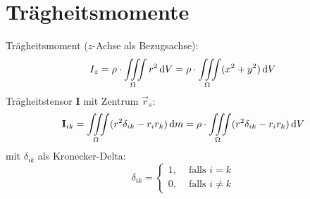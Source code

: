 \section{Trägheitsmomente}
Trägheitsmoment ($z$-Achse als Bezugsachse):
\[ I_z = \rho\cdot\iiint\limits_\Omega r^2\,\mathrm{d} V=\rho\cdot\iiint\limits_\Omega (x^2+y^2)\,\mathrm{d} V \]
Trägheitstensor \textbf{I} mit Zentrum $\vec{r}_s$:
\[ \textbf{I}_{ik} = \iiint\limits_\Omega(r^2\delta_{ik}-r_ir_k)\,\mathrm{d} m
	= \rho\cdot\iiint\limits_\Omega(r^2\delta_{ik}-r_ir_k)\,\mathrm{d} V \]
mit $\delta_{ik}$ als Kronecker-Delta:
\[ \delta_{ik} = \left\lbrace \begin{matrix}
	1, & \text{ falls }i=k \\ 0, & \text{ falls }i\neq k \end{matrix} \right. \]